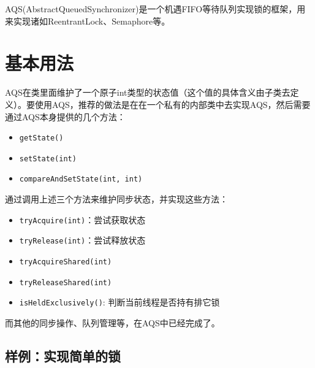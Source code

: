 \documentclass[12pt]{article}
\begin{document}
\makeblogtitle

AQS(AbstractQueuedSynchronizer)是一个机遇FIFO等待队列实现锁的框架，用来实现诸如ReentrantLock、Semaphore等。

\begin{Shaded}
\begin{Highlighting}[]
   
 
 
\end{Highlighting}
\end{Shaded}

\section{基本用法}\label{ux57faux672cux7528ux6cd5}

AQS在类里面维护了一个原子int类型的状态值（这个值的具体含义由子类去定义）。要使用AQS，推荐的做法是在在一个私有的内部类中去实现AQS，然后需要通过AQS本身提供的几个方法：

\begin{itemize}
\tightlist
\item
  \texttt{getState()}
\item
  \texttt{setState(int)}
\item
  \texttt{compareAndSetState(int,\ int)}
\end{itemize}

通过调用上述三个方法来维护同步状态，并实现这些方法：

\begin{itemize}
\tightlist
\item
  \texttt{tryAcquire(int)}：尝试获取状态
\item
  \texttt{tryRelease(int)}：尝试释放状态
\item
  \texttt{tryAcquireShared(int)}
\item
  \texttt{tryReleaseShared(int)}
\item
  \texttt{isHeldExclusively()}: 判断当前线程是否持有排它锁
\end{itemize}

而其他的同步操作、队列管理等，在AQS中已经完成了。

\subsection{样例：实现简单的锁}\label{ux6837ux4f8bux5b9eux73b0ux7b80ux5355ux7684ux9501}
\end{document}
